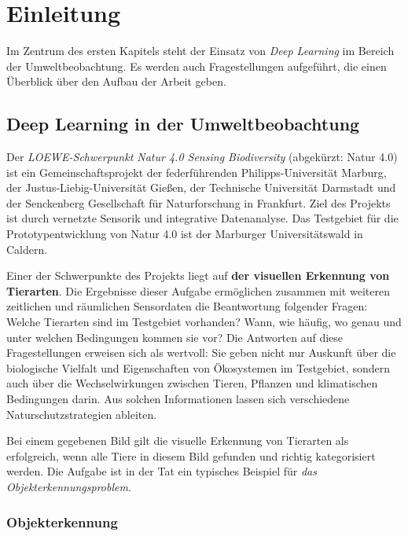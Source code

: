 \chapter{Einleitung}

Im Zentrum des ersten Kapitels steht der Einsatz von \emph{Deep Learning} im Bereich der Umweltbeobachtung. Es werden auch Fragestellungen aufgeführt, die einen Überblick über den Aufbau der Arbeit geben.

\section{Deep Learning in der Umweltbeobachtung}

Der \emph{LOEWE-Schwerpunkt Natur 4.0 Sensing Biodiversity} (abgekürzt: Natur 4.0) ist ein Gemeinschaftsprojekt der federführenden Philipps-Universität Marburg, der Justus-Liebig-Universität Gießen, der Technische Universität Darmstadt und der Senckenberg Gesellschaft für Naturforschung in Frankfurt. Ziel des Projekts ist  durch vernetzte Sensorik und integrative Datenanalyse. Das Testgebiet für die Prototypentwicklung von Natur 4.0 ist der Marburger Universitätswald in Caldern. 

Einer der Schwerpunkte des Projekts liegt auf \textbf{der visuellen Erkennung von Tierarten}. Die Ergebnisse dieser Aufgabe ermöglichen zusammen mit weiteren zeitlichen und räumlichen Sensordaten die Beantwortung folgender Fragen: Welche Tierarten sind im Testgebiet vorhanden? Wann, wie häufig, wo genau und unter welchen Bedingungen kommen sie vor? Die Antworten auf diese Fragestellungen erweisen sich als wertvoll: Sie geben nicht nur Auskunft über die biologische Vielfalt und Eigenschaften von Ökosystemen im Testgebiet, sondern auch über die Wechselwirkungen zwischen Tieren, Pflanzen und klimatischen Bedingungen darin. Aus solchen Informationen lassen sich verschiedene Naturschutzstrategien ableiten.

Bei einem gegebenen Bild gilt die visuelle Erkennung von Tierarten als erfolgreich, wenn alle Tiere in diesem Bild gefunden und richtig kategorisiert werden. Die Aufgabe ist in der Tat ein typisches Beispiel für \emph{das Objekterkennungsproblem}.

\subsection{Objekterkennung}

